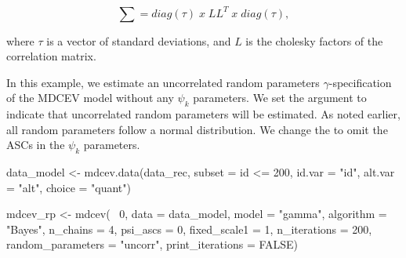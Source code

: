 \begin{equation}
\sum = diag(\tau) \; x \; LL^T \; x \; diag(\tau),
\end{equation}

where \(\tau\) is a vector of standard deviations, and \(L\) is the
cholesky factors of the correlation matrix.

In this example, we estimate an uncorrelated random parameters
\(\gamma\)-specification of the MDCEV model without any \(\psi_k\)
parameters. We set the argument  to
indicate that uncorrelated random parameters will be estimated. As noted
earlier, all random parameters follow a normal distribution. We change
the  to omit the ASCs in the \(\psi_k\) parameters.

\begin{Schunk}
\begin{Sinput}
data_model <- mdcev.data(data_rec, subset = id <= 200,
                       id.var = "id",
                       alt.var = "alt",
                       choice = "quant") 

mdcev_rp <- mdcev(~ 0,
                    data = data_model,
                    model = "gamma",
                    algorithm = "Bayes",
                    n_chains = 4,
                    psi_ascs = 0,
                    fixed_scale1 = 1,
                    n_iterations = 200,
                    random_parameters = "uncorr",
                    print_iterations = FALSE)
\end{Sinput}
\end{Schunk}

